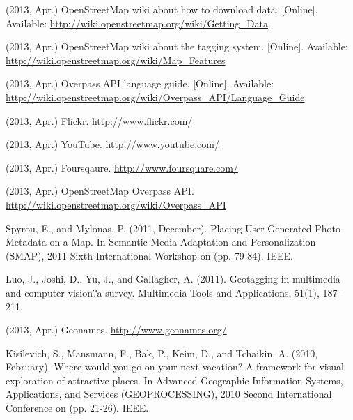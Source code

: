 \documentclass[journal]{IEEEtran}
\begin{document}

%
%
%


\begin{thebibliography}{1}

(2013, Apr.) OpenStreetMap wiki about how to download data. [Online]. Available: \url{http://wiki.openstreetmap.org/wiki/Getting_Data}

(2013, Apr.) OpenStreetMap wiki about the tagging system. [Online]. Available: \url{http://wiki.openstreetmap.org/wiki/Map_Features}

(2013, Apr.) Overpass API language guide. [Online]. Available: \url{http://wiki.openstreetmap.org/wiki/Overpass_API/Language_Guide}

(2013, Apr.) Flickr. \url{http://www.flickr.com/}

(2013, Apr.) YouTube. \url{http://www.youtube.com/}

(2013, Apr.) Foursqaure. \url{http://www.foursquare.com/}

(2013, Apr.) OpenStreetMap Overpass API. \url{http://wiki.openstreetmap.org/wiki/Overpass_API}

Spyrou, E., and Mylonas, P. (2011, December). Placing User-Generated Photo Metadata on a Map. In Semantic Media Adaptation and Personalization (SMAP), 2011 Sixth International Workshop on (pp. 79-84). IEEE.

Luo, J., Joshi, D., Yu, J., and Gallagher, A. (2011). Geotagging in multimedia and computer vision?a survey. Multimedia Tools and Applications, 51(1), 187-211.

(2013, Apr.) Geonames. \url{http://www.geonames.org/}

Kisilevich, S., Mansmann, F., Bak, P., Keim, D., and Tchaikin, A. (2010, February). Where would you go on your next vacation? A framework for visual exploration of attractive places. In Advanced Geographic Information Systems, Applications, and Services (GEOPROCESSING), 2010 Second International Conference on (pp. 21-26). IEEE.


\end{thebibliography}
\end{document}
